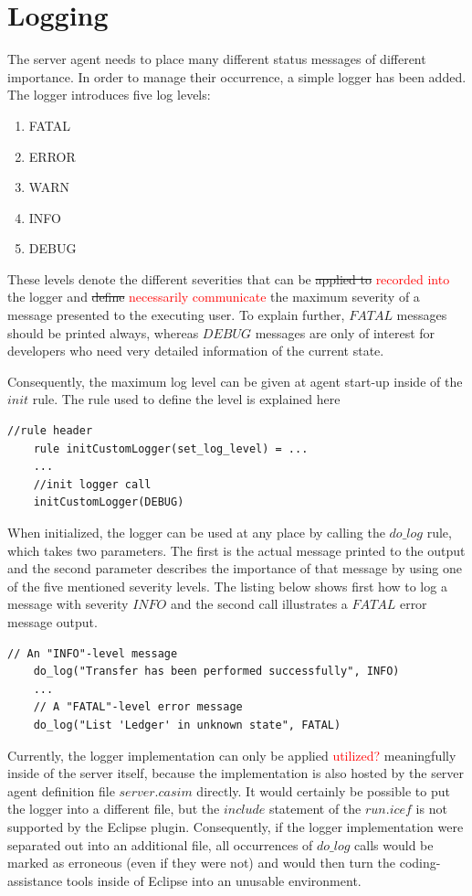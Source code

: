 \section{Logging}
\label{sec:impl-log}

The server agent needs to place many different status messages of different importance. In order to manage their occurrence, a simple logger has been added. The logger introduces five log levels:
\begin{enumerate}
	\item FATAL
	\item ERROR
	\item WARN
	\item INFO
	\item DEBUG
\end{enumerate}
These levels denote the different severities that can be \st{applied to} \textcolor{red}{recorded into} the logger and \st{define} \textcolor{red}{necessarily communicate} the maximum severity of a message presented to the executing user. To explain further, $FATAL$ messages should be printed always, whereas $DEBUG$ messages are only of interest for developers who need very detailed information of the current state.

Consequently, the maximum log level can be given at agent start-up inside of the $init$ rule. The rule used to define the level is explained here

\begin{lstlisting}[language=bsl]
	//rule header
	rule initCustomLogger(set_log_level) = ...
	...
	//init logger call
	initCustomLogger(DEBUG)
\end{lstlisting}

When initialized, the logger can be used at any place by calling the $do\_log$ rule, which takes two parameters. The first is the actual message printed to the output and the second parameter describes the importance of that message by using one of the five mentioned severity levels. The listing below shows first how to log a message with severity $INFO$ and the second call illustrates a $FATAL$ error message output.
	
\begin{lstlisting}[language=bsl]
	// An "INFO"-level message
	do_log("Transfer has been performed successfully", INFO)
	...
	// A "FATAL"-level error message
	do_log("List 'Ledger' in unknown state", FATAL)
\end{lstlisting}

Currently, the logger implementation can only be applied \textcolor{red}{utilized?} meaningfully inside of the server itself, because the implementation is also hosted by the server agent definition file $server.casim$ directly. It would certainly be possible to put the logger into a different file, but the $include$ statement of the $run.icef$ is not supported by the Eclipse plugin. Consequently, if the logger implementation were separated out into an additional file, all occurrences of $do\_log$ calls would be marked as erroneous (even if they were not) and would then turn the coding-assistance tools inside of Eclipse into an unusable environment.


